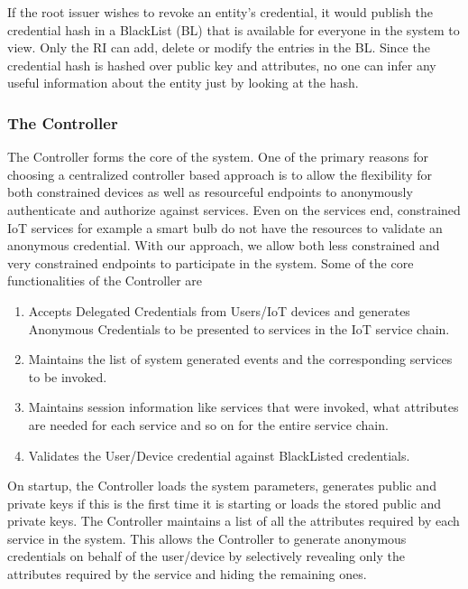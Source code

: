\documentclass[journal]{IEEEtran}
\begin{document}
If the root issuer wishes to revoke an entity's credential, it would publish the credential hash in a BlackList (BL) that is available for everyone in the system to view. Only the RI can add, delete or modify the entries in the BL. Since the credential hash is hashed over public key and attributes, no one can infer any useful information about the entity just by looking at the hash.

\subsubsection{The Controller} \label{controller}
The Controller forms the core of the system. One of the primary reasons for choosing a centralized controller based approach is to allow the flexibility for both constrained devices as well as resourceful endpoints to anonymously authenticate and authorize against services. Even on the services end, constrained IoT services for example a smart bulb do not have the resources to validate an anonymous credential. With our approach, we allow both less constrained and very constrained endpoints to participate in the system. Some of the core functionalities of the Controller are

\begin{enumerate}[label=\alph*)]
	\item Accepts Delegated Credentials from Users/IoT devices and generates Anonymous Credentials to be presented to services in the IoT service chain.
	\item Maintains the list of system generated events and the corresponding services to be invoked.
	\item Maintains session information like services that were invoked, what attributes are needed for each service and so on for the entire service chain.
	\item Validates the User/Device credential against BlackListed credentials.
\end{enumerate}
On startup, the Controller loads the system parameters, generates public and private keys if this is the first time it is starting or loads the stored public and private keys. The Controller maintains a list of all the attributes required by each service in the system. This allows the Controller to generate anonymous credentials on behalf of the user/device by selectively revealing only the attributes required by the service and hiding the remaining ones. 
\end{document}
